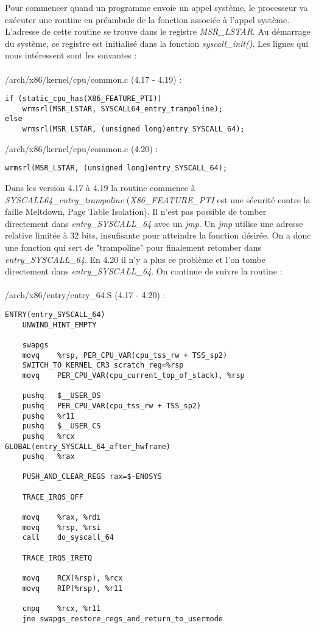 \documentclass[journal, a4paper]{IEEEtran}
\begin{document}
Pour commencer quand un programme envoie un appel système, le processeur va exécuter une routine en préambule de la fonction associée à l'appel système. L'adresse de cette routine se trouve dans le registre \textit{MSR\_LSTAR}. Au démarrage du système, ce registre est initialisé dans la fonction \textit{syscall\_init()}. Les lignes qui nous intéressent sont les suivantes :
\\
\\
/arch/x86/kernel/cpu/common.c (4.17 - 4.19) :
\begin{lstlisting}[style=CStyle]
if (static_cpu_has(X86_FEATURE_PTI))
 	wrmsrl(MSR_LSTAR, SYSCALL64_entry_trampoline);
else
 	wrmsrl(MSR_LSTAR, (unsigned long)entry_SYSCALL_64);
\end{lstlisting}
/arch/x86/kernel/cpu/common.c (4.20) :
\begin{lstlisting}[style=CStyle]
wrmsrl(MSR_LSTAR, (unsigned long)entry_SYSCALL_64);
\end{lstlisting}
Dans les version 4.17 à 4.19 la routine commence à \textit{SYSCALL64\_entry\_trampoline} (\textit{X86\_FEATURE\_PTI} est une sécurité contre la faille Meltdown, Page Table Isolation). Il n'est pas possible de tomber directement dans \textit{entry\_SYSCALL\_64} avec un \textit{jmp}. Un \textit{jmp} utilise une adresse relative limitée à 32 bits, insufisante pour atteindre la fonction désirée. On a donc une fonction qui sert de "trampoline" pour finalement retomber dans \textit{entry\_SYSCALL\_64}. En 4.20 il n'y a plus ce problème et l'on tombe directement dans \textit{entry\_SYSCALL\_64}. On continue de suivre la routine :
\\
\\
/arch/x86/entry/entry\_64.S (4.17 - 4.20) :
\begin{lstlisting}[style=CStyle]
ENTRY(entry_SYSCALL_64)
	UNWIND_HINT_EMPTY

	swapgs
	movq	%rsp, PER_CPU_VAR(cpu_tss_rw + TSS_sp2)
	SWITCH_TO_KERNEL_CR3 scratch_reg=%rsp
	movq	PER_CPU_VAR(cpu_current_top_of_stack), %rsp

	pushq	$__USER_DS	
	pushq	PER_CPU_VAR(cpu_tss_rw + TSS_sp2)
	pushq	%r11	
	pushq	$__USER_CS
	pushq	%rcx	
GLOBAL(entry_SYSCALL_64_after_hwframe)
	pushq	%rax	

	PUSH_AND_CLEAR_REGS rax=$-ENOSYS

	TRACE_IRQS_OFF

	movq	%rax, %rdi
	movq	%rsp, %rsi
	call	do_syscall_64

	TRACE_IRQS_IRETQ

	movq	RCX(%rsp), %rcx
	movq	RIP(%rsp), %r11

	cmpq	%rcx, %r11
	jne	swapgs_restore_regs_and_return_to_usermode
\end{lstlisting}
\end{document}
